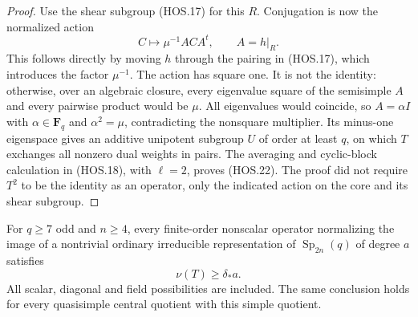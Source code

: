 \begin{proof}
Use the shear subgroup (HOS.17) for this $R$. Conjugation is
now the normalized action
\[
                         C\longmapsto\mu^{-1}ACA^t,
                              \qquad A=h|_R.                \tag{HOS.24}
\]
This follows directly by moving $h$ through the pairing in
(HOS.17), which introduces the factor $\mu^{-1}$.
The action has square one. It is not the identity: otherwise,
over an algebraic closure, every eigenvalue square of the
semisimple $A$ and every pairwise product would be $\mu$.
All eigenvalues would coincide, so $A=\alpha I$ with
$\alpha\in\mathbf F_q$ and $\alpha^2=\mu$, contradicting
the nonsquare multiplier. Its minus-one eigenspace gives an
additive unipotent subgroup $U$ of order at least $q$, on which
$T$ exchanges all nonzero dual weights in pairs.
The averaging and cyclic-block calculation in (HOS.18), with
$\ell=2$, proves (HOS.22). The proof did not require $T^2$
to be the identity as an operator, only the indicated action
on the core and its shear subgroup.
\end{proof}

\begin{theorem}
\label{D-HOS-05}
For $q\ge7$ odd and $n\ge4$, every finite-order nonscalar
operator normalizing the image of a nontrivial ordinary irreducible
representation of $\operatorname{Sp}_{2n}(q)$ of degree $a$ satisfies
\[
                              \nu(T)\ge\delta_* a.          \tag{HOS.25}
\]
All scalar, diagonal and field possibilities are included.
The same conclusion holds for every quasisimple central quotient
with this simple quotient.
\end{theorem}

